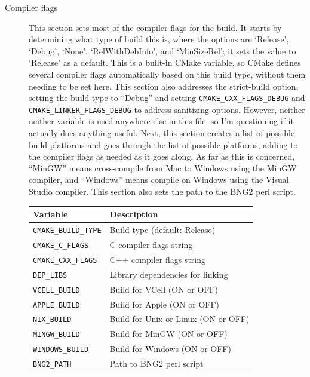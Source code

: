 \documentclass {scrbook}
\newcommand {\ttt} {\texttt}
\begin{document}
\begin{description}
\item[Compiler flags]
This section sets most of the compiler flags for the build. It starts by determining what type of build this is, where the options are `Release', `Debug', `None', `RelWithDebInfo', and `MinSizeRel'; it sets the value to `Release' as a default. This is a built-in CMake variable, so CMake defines several compiler flags automatically based on this build type, without them needing to be set here. This section also addresses the strict-build option, setting the build type to ``Debug'' and setting \ttt{CMAKE\_CXX\_FLAGS\_DEBUG} and \ttt{CMAKE\_LINKER\_FLAGS\_DEBUG} to address sanitizing options. However, neither neither variable is used anywhere else in this file, so I'm questioning if it actually does anything useful. Next, this section creates a list of possible build platforms and goes through the list of possible platforms, adding to the compiler flags as needed as it goes along. As far as this is concerned, ``MinGW'' means cross-compile from Mac to Windows using the MinGW compiler, and ``Windows'' means compile on Windows using the Visual Studio compiler. This section also sets the path to the BNG2 perl script.
\begin{longtable}[c]{ll}
Variable & Description\\
\hline
\ttt{CMAKE\_BUILD\_TYPE} & Build type (default: Release)\\
\ttt{CMAKE\_C\_FLAGS} & C compiler flags string\\
\ttt{CMAKE\_CXX\_FLAGS} & C++ compiler flags string\\
\ttt{DEP\_LIBS} & Library dependencies for linking\\
\ttt{VCELL\_BUILD} & Build for VCell (ON or OFF)\\
\ttt{APPLE\_BUILD} & Build for Apple (ON or OFF)\\
\ttt{NIX\_BUILD} & Build for Unix or Linux (ON or OFF)\\
\ttt{MINGW\_BUILD} & Build for MinGW (ON or OFF)\\
\ttt{WINDOWS\_BUILD} & Build for Windows (ON or OFF)\\
\ttt{BNG2\_PATH} & Path to BNG2 perl script\\
\end{longtable}


\end{description}
\end{document}
